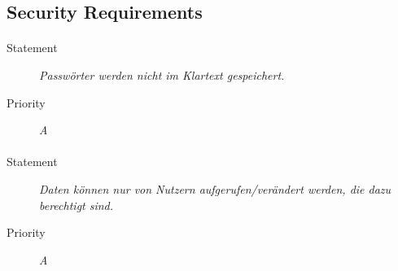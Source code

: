 \subsection{Security Requirements}
\paragraph{}
\begin{description}
\item [Statement] \textit{Passwörter werden nicht im Klartext gespeichert.}
\item [Priority] \textit{A}
\end{description}

\paragraph{}
\begin{description}
\item [Statement] \textit{Daten können nur von Nutzern aufgerufen/verändert werden, die dazu berechtigt sind.}
\item [Priority] \textit{A}
\end{description}